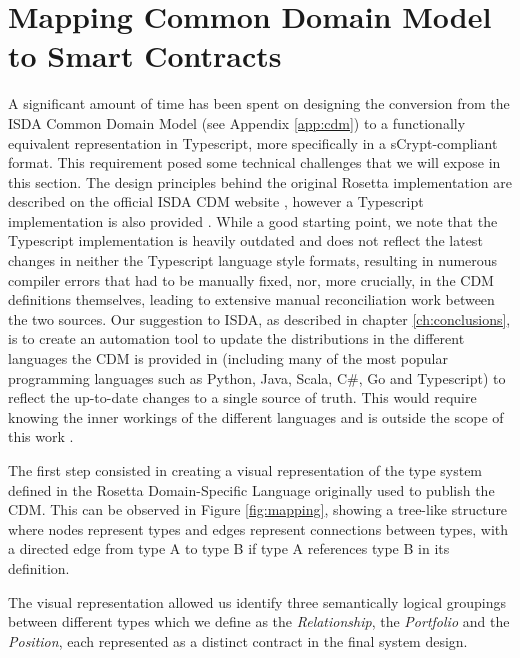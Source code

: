 \section{Mapping Common Domain Model to Smart Contracts}
\label{sec:mapping}

A significant amount of time has been spent on designing the conversion from the ISDA Common Domain Model (see Appendix \ref{app:cdm}) to a functionally equivalent representation in Typescript, more specifically in a sCrypt-compliant format. This requirement posed some technical challenges that we will expose in this section. The design principles behind the original Rosetta implementation are described on the official ISDA CDM website \citep{cdm_website}, however a Typescript implementation is also provided \citep{cdm_typescript}. While a good starting point, we note that the Typescript implementation is heavily outdated and does not reflect the latest changes in neither the Typescript language style formats, resulting in numerous compiler errors that had to be manually fixed, nor, more crucially, in the CDM definitions themselves, leading to extensive manual reconciliation work between the two sources. Our suggestion to ISDA, as described in chapter \ref{ch:conclusions}, is to create an automation tool to update the distributions in the different languages the CDM is provided in (including many of the most popular programming languages such as Python, Java, Scala, C\#, Go and Typescript) to reflect the up-to-date changes to a single source of truth. This would require knowing the inner workings of the different languages and is outside the scope of this work \label{cdm_tool}.

The first step consisted in creating a visual representation of the type system defined in the Rosetta Domain-Specific Language originally used to publish the CDM. This can be observed in Figure \ref{fig:mapping}, showing a tree-like structure where nodes represent types and edges represent connections between types, with a directed edge from type A to type B if type A references type B in its definition.

The visual representation allowed us identify three semantically logical groupings between different types which we define as the \textit{Relationship}, the \textit{Portfolio} and the \textit{Position}, each represented as a distinct contract in the final system design.

